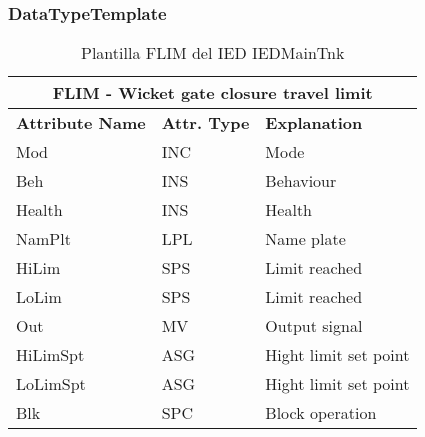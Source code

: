     \subsubsection{DataTypeTemplate}
    \begin{table}[H]
    \begin{center}
    \begin{tabular}{|l|l|p{8.5cm}|}
            \hline
            \multicolumn{3}{|c|}{\cellcolor[gray]{0.8} \textbf{ FLIM}  - Wicket gate closure travel limit} \\
            \hline
            \textbf{Attribute Name} & \textbf{Attr. Type} & \textbf{Explanation} \\
            \hline 
            Mod & INC & Mode \\
            \hline
            Beh & INS & Behaviour \\
            \hline
            Health & INS & Health \\
            \hline
            NamPlt & LPL & Name plate \\
            \hline
            HiLim & SPS & Limit reached \\
            \hline
            LoLim & SPS & Limit reached \\
            \hline
            Out & MV & Output signal \\
            \hline
            HiLimSpt & ASG & Hight limit set point \\
            \hline
            LoLimSpt & ASG & Hight limit set point \\
            \hline
            Blk & SPC & Block operation \\
            \hline
    \end{tabular}
    \caption{Plantilla FLIM del IED IEDMainTnk}
    \label{table:lnTypeFLIM_}
    \end{center}
    \end{table}
    
    
    